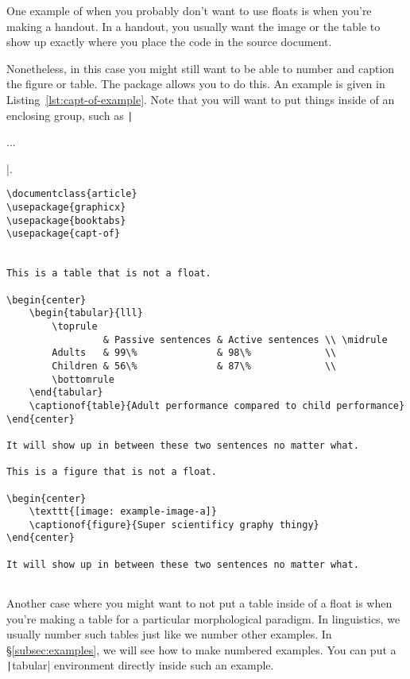 One example of when you probably don't want to use floats is when you're making a handout.
In a handout, you usually want the image or the table to show up exactly where you place the code in the source document.

Nonetheless, in this case you might still want to be able to number and caption the figure or table.
The package  allows you to do this.
An example is given in Listing~\ref{lst:capt-of-example}.
Note that you will want to put things inside of an enclosing group, such as \texttt|\begin{center}...\end{center}|.

\begin{listing}[htbp]
	\centering
	\begin{verbatim}
\documentclass{article}
\usepackage{graphicx}
\usepackage{booktabs}
\usepackage{capt-of}


This is a table that is not a float.

\begin{center}
    \begin{tabular}{lll}
        \toprule
                 & Passive sentences & Active sentences \\ \midrule
        Adults   & 99\%              & 98\%             \\
        Children & 56\%              & 87\%             \\
        \bottomrule
    \end{tabular}
    \captionof{table}{Adult performance compared to child performance}
\end{center}

It will show up in between these two sentences no matter what.

This is a figure that is not a float.

\begin{center}
    \texttt{[image: example-image-a]}
    \captionof{figure}{Super scientificy graphy thingy}
\end{center}

It will show up in between these two sentences no matter what.


	\end{verbatim}
	\caption{Examples of tables and images as non-floats}
	\label{lst:capt-of-example}
\end{listing}

Another case where you might want to not put a table inside of a float is when you're making a table for a particular morphological paradigm.
In linguistics, we usually number such tables just like we number other examples.
In \S\ref{subsec:examples}, we will see how to make numbered examples.
You can put a \texttt|tabular| environment directly inside such an example.

